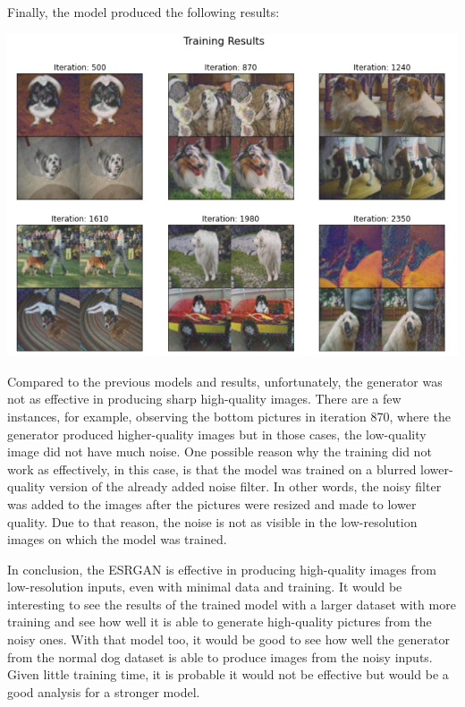 \documentclass{article}
\begin{document}
Finally, the model produced the following results:

\begin{center}
\includegraphics[scale=0.5]{images/img_noisy_dogs_training_results.jpg}
\end{center}

Compared to the previous models and results, unfortunately, the generator was not as effective in producing sharp high-quality images. There are a few instances, for example, observing the bottom pictures in iteration 870, where the generator produced higher-quality images but in those cases, the low-quality image did not have much noise. One possible reason why the training did not work as effectively, in this case, is that the model was trained on a blurred lower-quality version of the already added noise filter. In other words, the noisy filter was added to the images after the pictures were resized and made to lower quality. Due to that reason, the noise is not as visible in the low-resolution images on which the model was trained. 

In conclusion, the ESRGAN is effective in producing high-quality images from low-resolution inputs, even with minimal data and training. It would be interesting to see the results of the trained model with a larger dataset with more training and see how well it is able to generate high-quality pictures from the noisy ones. With that model too, it would be good to see how well the generator from the normal dog dataset is able to produce images from the noisy inputs. Given little training time, it is probable it would not be effective but would be a good analysis for a stronger model.
\end{document}
